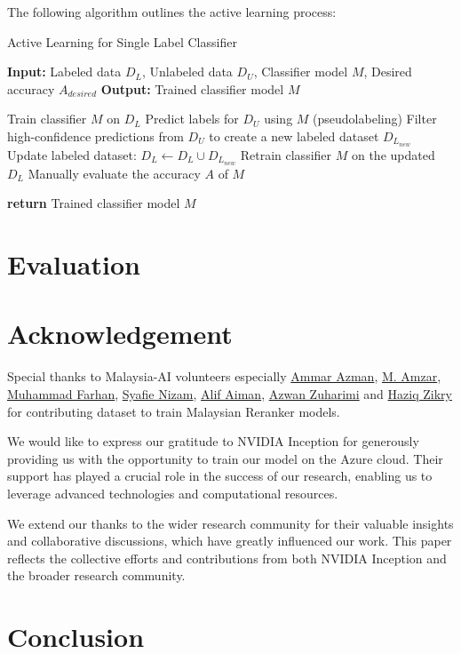 \documentclass[preprint]{article}
\begin{document}
The following algorithm outlines the active learning process:

\begin{algorithm}[H]
\caption{Active Learning for Single Label Classifier}
\begin{algorithmic}[1]
\State \textbf{Input:} Labeled data \(D_L\), Unlabeled data \(D_U\), Classifier model \(M\), Desired accuracy \(A_{desired}\)
\State \textbf{Output:} Trained classifier model \(M\)

    \State Train classifier \(M\) on \(D_L\)
    \State Predict labels for \(D_U\) using \(M\) (pseudolabeling)
    \State Filter high-confidence predictions from \(D_U\) to create a new labeled dataset \(D_{L_{new}}\)
    \State Update labeled dataset: \(D_L \leftarrow D_L \cup D_{L_{new}}\)
    \State Retrain classifier \(M\) on the updated \(D_L\)
    \State Manually evaluate the accuracy \(A\) of \(M\)
\EndWhile

\State \textbf{return} Trained classifier model \(M\)
\end{algorithmic}
\end{algorithm}



\section{Evaluation}


\section{Acknowledgement}

Special thanks to Malaysia-AI volunteers especially \href{https://www.linkedin.com/in/ammar-azman/}{Ammar Azman}, \href{https://www.linkedin.com/in/amzar96/}{M. Amzar}, \href{https://www.linkedin.com/in/muhammad-farhan-helmy-0529501a7/}{Muhammad Farhan}, \href{https://www.linkedin.com/in/syafie-nizam/}{Syafie Nizam}, \href{https://www.linkedin.com/in/alif-aiman-1b334b24b/}{Alif Aiman}, \href{https://www.linkedin.com/in/azwan-zuharimi/}{Azwan Zuharimi} and \href{https://www.linkedin.com/in/haziqzikry/}{Haziq Zikry} for contributing dataset to train Malaysian Reranker models.

We would like to express our gratitude to NVIDIA Inception for generously providing us with the opportunity to train our model on the Azure cloud. Their support has played a crucial role in the success of our research, enabling us to leverage advanced technologies and computational resources.

We extend our thanks to the wider research community for their valuable insights and collaborative discussions, which have greatly influenced our work. This paper reflects the collective efforts and contributions from both NVIDIA Inception and the broader research community.

\section{Conclusion}

{}

\end{document}

